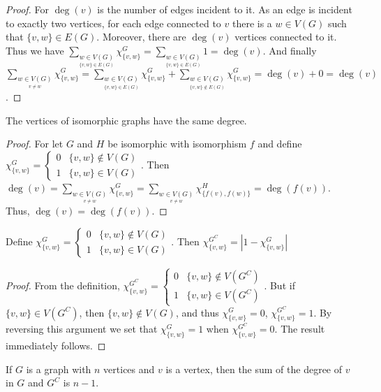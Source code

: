         \begin{proof}
        For $\deg(v)$ is the number of edges incident to it. As an edge is incident to exactly two vertices, for each edge connected to $v$ there is a $w\in V(G)$ such that $\{v,w\} \in E(G)$. Moreover, there are $\deg(v)$ vertices connected to it. Thus we have $\sum_{\underset{\{v,w\}\in E(G)}{w\in V(G)}} \chi_{\{v,w\}}^G = \sum_{\underset{\{v,w\}\in E(G)}{w\in V(G)}}1 = \deg(v)$. And finally $\sum_{\underset{v\ne w}{w\in V(G)}}\chi_{\{v,w\}}^G = \sum_{\underset{\{v,w\}\in E(G)}{w\in V(G)}}\chi_{\{v,w\}}^G+\sum_{\underset{\{v,w\}\notin E(G)}{w\in V(G)}}\chi_{\{v,w\}}^G = \deg(v) + 0 = \deg(v)$.
        \end{proof}
        \begin{theorem}
        The vertices of isomorphic graphs have the same degree.
        \end{theorem}
        \begin{proof}
        For let $G$ and $H$ be isomorphic with isomorphism $f$ and define $\chi_{\{v,w\}}^G = \begin{cases} 0 & \{v,w\} \notin V(G) \\ 1 & \{v,w\} \in V(G) \end{cases}$. Then $\deg(v) = \sum_{\underset{v\ne w}{w\in V(G)}}\chi_{\{v,w\}}^G =\sum_{\underset{v\ne w}{w\in V(G)}}\chi_{\{f(v),f(w)\}}^H = \deg(f(v))$. Thus, $\deg(v) = \deg(f(v))$.
        \end{proof}
        \begin{theorem}
        Define  $\chi_{\{v,w\}}^G = \begin{cases} 0 & \{v,w\} \notin V(G) \\ 1 & \{v,w\} \in V(G) \end{cases}$. Then $\chi_{\{v,w\}}^{G^C} = |1-\chi_{\{v,w\}}^G|$
        \end{theorem}
        \begin{proof}
        From the definition, $\chi_{\{v,w\}}^{G^C} = \begin{cases} 0 & \{v,w\} \notin V(G^C) \\ 1 & \{v,w\} \in V(G^C) \end{cases}$. But if $\{v,w\} \in V({G^C})$, then $\{v,w\}\notin V(G)$, and thus $\chi_{\{v,w\}}^G = 0$, $\chi_{\{v,w\}}^{G^C} = 1$. By reversing this argument we set that $\chi_{\{v,w\}}^{G} = 1$ when $\chi_{\{v,w\}}^{G^C} = 0$. The result immediately follows.
        \end{proof}
        \begin{theorem}
        If $G$ is a graph with $n$ vertices and $v$ is a vertex, then the sum of the degree of $v$ in $G$ and $G^C$ is $n-1$.
        \end{theorem}
